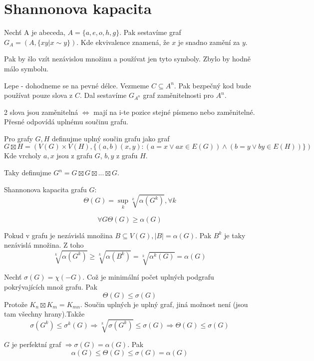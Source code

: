 \section{\texorpdfstring{Shannonova kapacita}{Shannonova kapacita}}
\vspace{5mm}
\large

\begin{definition}
Nechť A je abeceda, $A = \{a, e, o, h, g\}$.
Pak sestavíme graf $G_A = (A, \{xy | x \sim y \})$. Kde ekvivalence znamená, že $x$ je snadno zamění za $y$.
\end{definition}
Pak by šlo vzít nezávislou množinu a používat jen tyto symboly. Zbylo by hodně málo symbolu.

Lepe - dohodneme se na pevné délce. Vezmeme $C \subseteq A^n$. Pak bezpečný kod bude používat pouze slova z $C$.
Dal sestavíme $G_{A^n}$ graf zaměnitelnosti pro $A^n$.

\begin{observation}
	2 slova jsou zaměnitelná $\iff$ mají na i-te pozice stejné písmeno nebo zaměnitelné. Přesné odpovídá uplnému součinu grafu.
\end{observation}

\begin{definition}
	Pro grafy $G, H$ definujme uplný součin grafu jako graf
\[ G \boxtimes H = (V(G) \times V(H), \{(a, b)(x, y): (a = x \lor ax \in E(G)) \land (b = y \lor by \in E(H))\}) \]
Kde vrcholy $a,x$ jsou z grafu $G$, $b,y$ z grafu $H$.

	Taky definujme $G^n = G \boxtimes G \boxtimes ... \boxtimes G$.
\end{definition}
\begin{definition}
	Shannonova kapacita grafu $G$:
	\[ \Theta(G) = \sup_k \sqrt[k]{\alpha(G^k)}, \forall k \]
\end{definition}
\begin{observation}
	\[\forall G \Theta(G) \geq \alpha(G)\]

	Pokud v grafu je nezávislá množina $B \subseteq V(G), |B| = \alpha(G)$. Pak $B^k$ je taky nezávislá množina.
	Z toho
	\[ \sqrt[k]{\alpha(G^k)} \geq \sqrt[k]{\alpha(B^k)} = \sqrt[k]{\alpha^k(G)} = \alpha(G) \]
\end{observation}
\begin{observation}
	Nechť $\sigma(G) = \chi(-G)$. Což je minimální počet uplných podgrafu pokrývajících množ grafu. Pak
	\[ \Theta(G) \leq \sigma(G) \]
	Protože $K_n \boxtimes K_m = K_{mn}$. Součin uplných je uplný graf, jiná možnost není (jsou tam všechny hrany).Takže
	\[ \sigma(G^k) \leq \sigma^k(G) \Rightarrow \sqrt[k]{\sigma(G^k)} \leq \sigma(G) \Rightarrow \Theta(G) \leq \sigma(G) \]
\end{observation}
\begin{observation}
	$G$ je perfektní graf $\Rightarrow \sigma(G) = \alpha(G)$. Pak
	\[ \alpha(G) \leq \Theta(G) \leq \sigma(G) = \alpha(G) \]
\end{observation}

